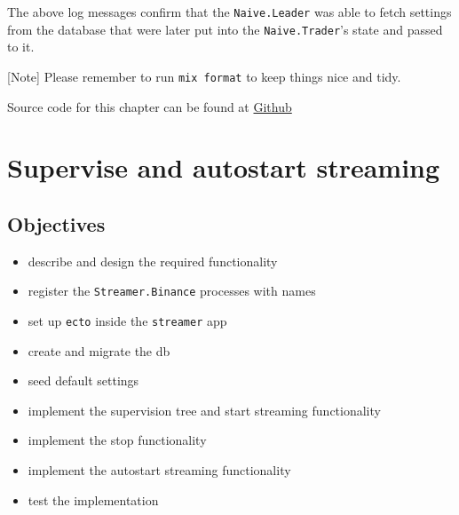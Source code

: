 \documentclass[
]{book}
\newenvironment{Shaded}{\begin{snugshade}}{\end{snugshade}}
\newcommand{\AttributeTok}[1]{\textcolor[rgb]{0.77,0.63,0.00}{#1}}
\newcommand{\CommentTok}[1]{\textcolor[rgb]{0.56,0.35,0.01}{\textit{#1}}}
\newcommand{\ControlFlowTok}[1]{\textcolor[rgb]{0.13,0.29,0.53}{\textbf{#1}}}
\newcommand{\ErrorTok}[1]{\textcolor[rgb]{0.64,0.00,0.00}{\textbf{#1}}}
\newcommand{\ExtensionTok}[1]{#1}
\newcommand{\KeywordTok}[1]{\textcolor[rgb]{0.13,0.29,0.53}{\textbf{#1}}}
\newcommand{\NormalTok}[1]{#1}
\newcommand{\OperatorTok}[1]{\textcolor[rgb]{0.81,0.36,0.00}{\textbf{#1}}}
\newcommand{\StringTok}[1]{\textcolor[rgb]{0.31,0.60,0.02}{#1}}
\providecommand{\tightlist}{%
  \setlength{\itemsep}{0pt}\setlength{\parskip}{0pt}}
\begin{document}
\begin{Shaded}
\end{Shaded}

The above log messages confirm that the \texttt{Naive.Leader} was able to fetch settings from the database that were later put into the \texttt{Naive.Trader}'s state and passed to it.

{[}Note{]} Please remember to run \texttt{mix\ format} to keep things nice and tidy.

Source code for this chapter can be found at \href{https://github.com/frathon/create-a-cryptocurrency-trading-bot-in-elixir-source-code/tree/chapter_10}{Github}

\hypertarget{supervise-and-autostart-streaming}{%
\chapter{Supervise and autostart streaming}\label{supervise-and-autostart-streaming}}

\hypertarget{objectives-10}{%
\section{Objectives}\label{objectives-10}}

\begin{itemize}
\tightlist
\item
  describe and design the required functionality
\item
  register the \texttt{Streamer.Binance} processes with names
\item
  set up \texttt{ecto} inside the \texttt{streamer} app
\item
  create and migrate the db
\item
  seed default settings
\item
  implement the supervision tree and start streaming functionality
\item
  implement the stop functionality
\item
  implement the autostart streaming functionality
\item
  test the implementation
\end{itemize}
\end{document}
